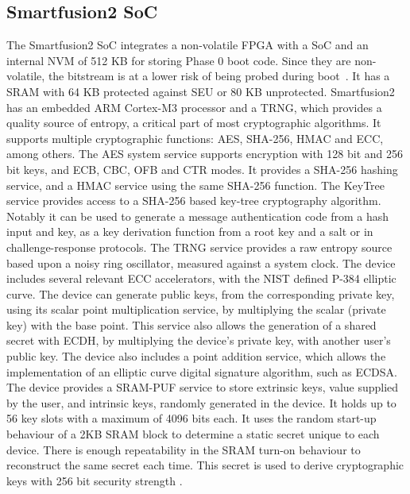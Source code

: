 \subsection*{Smartfusion2 SoC}\label{chap:background:computing:smartfusion}
The Smartfusion2 \ac{SoC} integrates a non-volatile \ac{FPGA} with a \ac{SoC} and an internal \ac{NVM} of 512 KB for storing Phase 0 boot code.
Since they are non-volatile, the bitstream is at a lower risk of being probed during boot~\cite{parrinha2017flexible}. It has a \ac{SRAM} with 64 KB protected against \ac{SEU} or 80 KB unprotected. Smartfusion2 has an embedded ARM Cortex-M3 processor and a \ac{TRNG}, which provides a quality source of entropy, a critical part of most cryptographic algorithms. It supports multiple cryptographic functions: \ac{AES}, \ac{SHA}-256, \ac{HMAC} and \ac{ECC}, among others.
The \ac{AES} system service supports encryption with 128 bit and 256 bit keys, and ECB, CBC, OFB and CTR modes.
It provides a \ac{SHA}-256 hashing service, and a \ac{HMAC} service using the same \ac{SHA}-256 function.
The KeyTree service provides access to a SHA-256 based key-tree cryptography algorithm. Notably it can be used to generate a message authentication code from a hash input and key, as a key derivation function from a root key and a salt or in challenge-response protocols.
The \ac{TRNG} service provides a raw entropy source based upon a noisy ring oscillator, measured against a system clock.
The device includes several relevant \ac{ECC} accelerators, with the \ac{NIST} defined P-384 elliptic curve.
The device can generate public keys, from the corresponding private key, using its scalar point multiplication service, by multiplying the scalar (private key) with the base point. This service also allows the generation of a shared secret with \ac{ECDH}, by multiplying the device's private key, with another user's public key.
The device also includes a point addition service, which allows the implementation of an elliptic curve digital signature algorithm, such as ECDSA.
The device provides a SRAM-PUF service to store extrinsic keys, value supplied by the user, and intrinsic keys, randomly generated in the device.
It holds up to 56 key slots with a maximum of 4096 bits each.
It uses the random start-up behaviour of a 2KB \ac{SRAM} block to determine a static secret unique to each device. There is enough repeatability in the SRAM turn-on behaviour to reconstruct the same secret each time. This secret is used to derive cryptographic keys with 256 bit security strength \cite{smartfusionSecurityPractices}.
